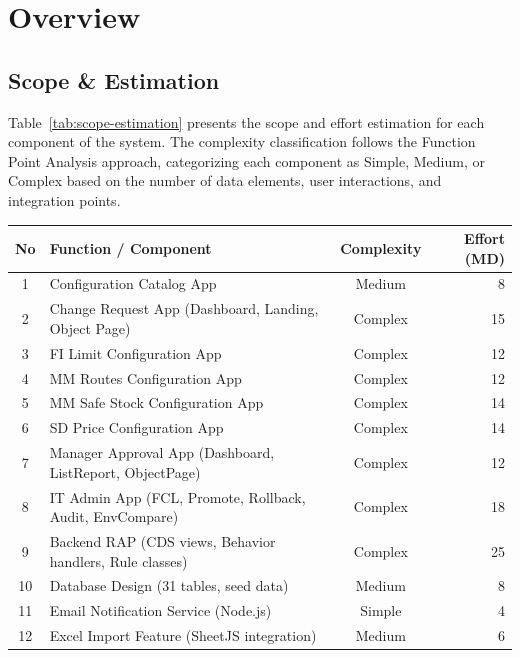 \documentclass[12pt,a4paper]{report}
\begin{document}
\section{Overview}

\subsection{Scope \& Estimation}

Table~\ref{tab:scope-estimation} presents the scope and effort estimation for each component of the system. The complexity classification follows the Function Point Analysis approach, categorizing each component as Simple, Medium, or Complex based on the number of data elements, user interactions, and integration points.

\begin{table}[H]
\centering\small
\begin{tabularx}{\textwidth}{|c|X|c|r|}
  \hline
  \rowcolor{tableheadpeach}
  \textbf{No} & \textbf{Function / Component} & \textbf{Complexity} & \textbf{Effort (MD)} \\ \hline
  1  & Configuration Catalog App                               & Medium  &  8 \\ \hline
  2  & Change Request App (Dashboard, Landing, Object Page)    & Complex & 15 \\ \hline
  3  & FI Limit Configuration App                              & Complex & 12 \\ \hline
  4  & MM Routes Configuration App                             & Complex & 12 \\ \hline
  5  & MM Safe Stock Configuration App                         & Complex & 14 \\ \hline
  6  & SD Price Configuration App                              & Complex & 14 \\ \hline
  7  & Manager Approval App (Dashboard, ListReport, ObjectPage)& Complex & 12 \\ \hline
  8  & IT Admin App (FCL, Promote, Rollback, Audit, EnvCompare)& Complex & 18 \\ \hline
  9  & Backend RAP (CDS views, Behavior handlers, Rule classes)& Complex & 25 \\ \hline
  10 & Database Design (31 tables, seed data)                   & Medium  &  8 \\ \hline
  11 & Email Notification Service (Node.js)                     & Simple  &  4 \\ \hline
  12 & Excel Import Feature (SheetJS integration)               & Medium  &  6 \\ \hline

\end{tabularx}
\end{table}
\end{document}
